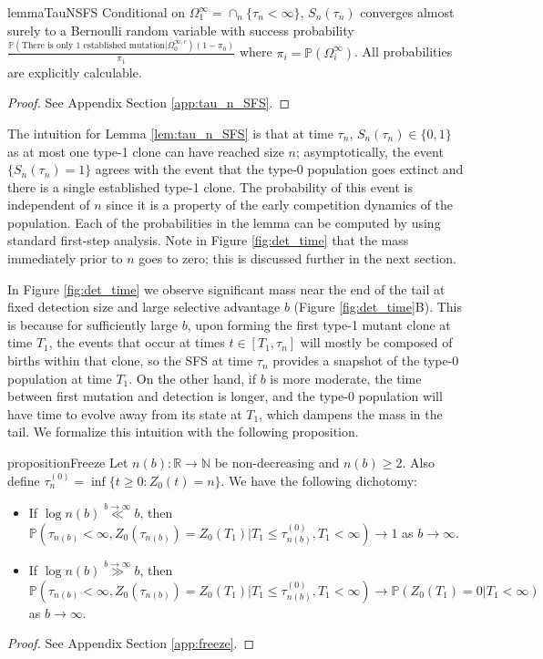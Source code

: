 \documentclass{article}
\numberwithin{equation}{section}
\newcommand{\ggas}[2]{\overset{{#1}\to {#2}}{\gg}}
\newcommand{\llas}[2]{\overset{{#1}\to {#2}}{\ll}}
\begin{document}
\begin{restatable}{lemma}{TauNSFS}
    Conditional on $\Omega_1^\infty = \cap_n \{\tau_n<\infty\}$, $S_n(\tau_n)$ converges almost surely to a Bernoulli random variable with success probability $\frac{\mathbb{P}(\text{There is only 1 established mutation}|\Omega_0^{\infty,c})(1-\pi_0)}{\pi_1}$ where $\pi_i=\mathbb{P}(\Omega_i^\infty)$. All probabilities are explicitly calculable.\label{lem:tau_n_SFS}
\end{restatable}
\begin{proof}
  See Appendix Section \ref{app:tau_n_SFS}.
\end{proof}
The intuition for Lemma \ref{lem:tau_n_SFS} is that at time $\tau_n$, $S_n(\tau_n) \in \{0,1\}$ as at most one type-1 clone can have reached size $n$; asymptotically, the event $\{S_n(\tau_n)=1\}$ agrees with the event that the type-0 population goes extinct and there is a single established type-1 clone.  The probability of this event is independent of $n$ since it is a property of the early competition dynamics of the population. Each of the probabilities in the lemma can be computed by using standard first-step analysis. Note in Figure \ref{fig:det_time} that the mass immediately prior to $n$ goes to zero; this is discussed further in the next section.

In Figure \ref{fig:det_time} we observe significant mass near the end of the tail at fixed detection size and large selective advantage $b$ (Figure \ref{fig:det_time}B). This is because for sufficiently large $b$, upon forming the first type-1 mutant clone at time $T_1$, the events that occur at times $t \in [T_1, \tau_n]$ will mostly be composed of births within that clone, so the SFS at time $\tau_n$ provides a snapshot of the type-0 population at time $T_1$. On the other hand, if $b$ is more moderate, the time between first mutation and detection is longer, and the type-0 population will have time to evolve away from its state at $T_1$, which dampens the mass in the tail. We formalize this intuition with the following proposition.
\begin{restatable}{proposition}{Freeze}
    Let $n(b):\mathbb{R}\to \mathbb{N}$ be non-decreasing and $n(b)\geq 2$.  Also define $\tau_n^{(0)}=\inf\{t\geq 0:Z_0(t)=n\}$. We have the following dichotomy:
    \begin{itemize}
        \item If $\log n(b)\llas{b}{\infty}b$, then $\mathbb{P}(\tau_{n(b)}<\infty,Z_0(\tau_{n(b)})=Z_0(T_1)|T_1\leq \tau_{n(b)}^{(0)},T_1<\infty)\to 1$ as $b\to\infty$. 
        \item If $\log n(b)\ggas{b}{\infty}b$, then $\mathbb{P}(\tau_{n(b)}<\infty,Z_0(\tau_{n(b)})=Z_0(T_1)|T_1\leq \tau_{n(b)}^{(0)},T_1<\infty)\to \mathbb{P}(Z_0(T_1)=0|T_1<\infty)$ as $b\to\infty$.
    \end{itemize}
\end{restatable}
\begin{proof}
  See Appendix Section \ref{app:freeze}.
\end{proof}
\end{document}
